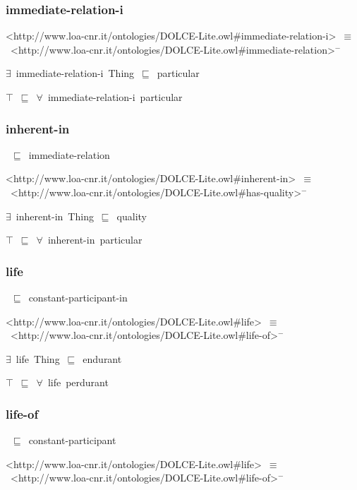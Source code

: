 \documentclass{article}
\begin{document}
\subsubsection*{immediate-relation-i}

<http://www.loa-cnr.it/ontologies/DOLCE-Lite.owl#immediate-relation-i>~\ensuremath{\equiv}~<http://www.loa-cnr.it/ontologies/DOLCE-Lite.owl#immediate-relation>\ensuremath{^-}

\ensuremath{\exists}~immediate-relation-i~Thing~\ensuremath{\sqsubseteq}~particular

\ensuremath{\top}~\ensuremath{\sqsubseteq}~\ensuremath{\forall}~immediate-relation-i~particular

\subsubsection*{inherent-in}

~\ensuremath{\sqsubseteq}~immediate-relation

<http://www.loa-cnr.it/ontologies/DOLCE-Lite.owl#inherent-in>~\ensuremath{\equiv}~<http://www.loa-cnr.it/ontologies/DOLCE-Lite.owl#has-quality>\ensuremath{^-}

\ensuremath{\exists}~inherent-in~Thing~\ensuremath{\sqsubseteq}~quality

\ensuremath{\top}~\ensuremath{\sqsubseteq}~\ensuremath{\forall}~inherent-in~particular

\subsubsection*{life}

~\ensuremath{\sqsubseteq}~constant-participant-in

<http://www.loa-cnr.it/ontologies/DOLCE-Lite.owl#life>~\ensuremath{\equiv}~<http://www.loa-cnr.it/ontologies/DOLCE-Lite.owl#life-of>\ensuremath{^-}

\ensuremath{\exists}~life~Thing~\ensuremath{\sqsubseteq}~endurant

\ensuremath{\top}~\ensuremath{\sqsubseteq}~\ensuremath{\forall}~life~perdurant

\subsubsection*{life-of}

~\ensuremath{\sqsubseteq}~constant-participant

<http://www.loa-cnr.it/ontologies/DOLCE-Lite.owl#life>~\ensuremath{\equiv}~<http://www.loa-cnr.it/ontologies/DOLCE-Lite.owl#life-of>\ensuremath{^-}
\end{document}
